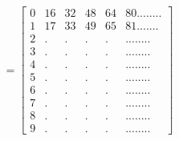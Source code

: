 \documentclass[preview]{standalone}
\begin{document}
\begin{align*}
= \begin{bmatrix} 0 & 16 & 32 & 48 & 64 & 80........\\ 1 & 17 & 33 & 49 & 65 & 81 .......\\ 2 & . & . & . & . & ........    
            \\ 3 & . & . & . & . & ........\\ 4 & . & . & . & . & ........\\ 5 & . & . & . & . & ........\\ 6 & . & . & . & . & ........
            \\ 7 & . & . & . & . & ........\\ 8 & . & . & . & . & ........\\ 9 & . & . & . & . & ........\end{bmatrix}
\end{align*}
\end{document}
